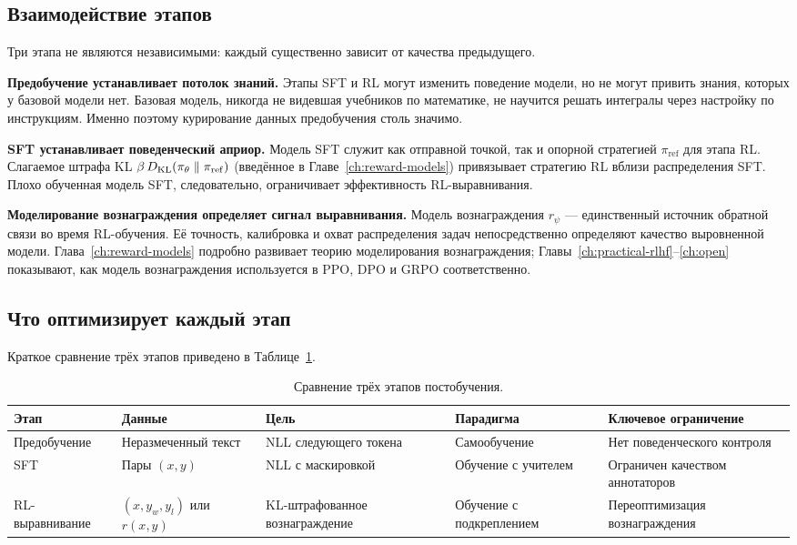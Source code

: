 \subsection{Взаимодействие этапов}

Три этапа не являются независимыми: каждый существенно зависит от качества предыдущего.

\textbf{Предобучение устанавливает потолок знаний.} Этапы SFT и RL могут изменить поведение модели, но не могут привить знания, которых у базовой модели нет. Базовая модель, никогда не видевшая учебников по математике, не научится решать интегралы через настройку по инструкциям. Именно поэтому курирование данных предобучения столь значимо.

\textbf{SFT устанавливает поведенческий априор.} Модель SFT служит как отправной точкой, так и опорной стратегией $\pi_{\mathrm{ref}}$ для этапа RL. Слагаемое штрафа KL $\beta\,D_{\mathrm{KL}}\!\left(\pi_\theta\;\|\;\pi_{\mathrm{ref}}\right)$ (введённое в Главе~\ref{ch:reward-models}) привязывает стратегию RL вблизи распределения SFT. Плохо обученная модель SFT, следовательно, ограничивает эффективность RL-выравнивания.

\textbf{Моделирование вознаграждения определяет сигнал выравнивания.} Модель вознаграждения $r_\psi$ --- единственный источник обратной связи во время RL-обучения. Её точность, калибровка и охват распределения задач непосредственно определяют качество выровненной модели. Глава~\ref{ch:reward-models} подробно развивает теорию моделирования вознаграждения; Главы~\ref{ch:practical-rlhf}--\ref{ch:open} показывают, как модель вознаграждения используется в PPO, DPO и GRPO соответственно.

\subsection{Что оптимизирует каждый этап}

Краткое сравнение трёх этапов приведено в Таблице~\ref{tab:pipeline-comparison}.

\begin{table}[ht]
\centering
\caption{Сравнение трёх этапов постобучения.}
\label{tab:pipeline-comparison}
\footnotesize
\begin{tabular}{@{}p{1.9cm}p{2.9cm}p{2.4cm}p{1.9cm}p{2.8cm}@{}}
\toprule
\textbf{Этап} & \textbf{Данные} & \textbf{Цель} & \textbf{Парадигма} & \textbf{Ключевое ограничение} \\
\midrule
Предобучение & Неразмеченный текст & NLL следующего токена & Самообучение & Нет поведенческого контроля \\
SFT & Пары $(x, y)$ & NLL с маскировкой & Обучение с учителем & Ограничен качеством аннотаторов \\
RL-выравнивание & $(x, y_w, y_l)$ или $r(x,y)$ & KL-штрафованное вознаграждение & Обучение с подкреплением & Переоптимизация вознаграждения \\
\bottomrule
\end{tabular}
\end{table}

